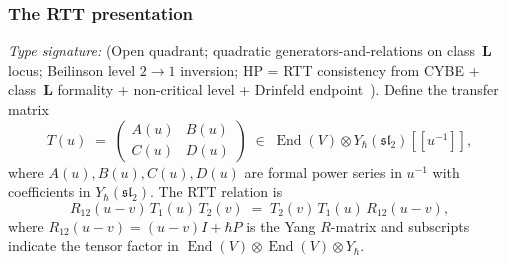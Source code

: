 \subsubsection*{The RTT presentation}

\begin{theorem}
\label{thm:rtt-sl2}
\emph{Type signature:} (Open quadrant; quadratic generators-and-relations
on class~$\mathbf L$ locus; Beilinson level $2 \to 1$ inversion; HP =
RTT consistency from CYBE + class~$\mathbf L$ formality + non-critical
level + Drinfeld endpoint~\cite{Drinfeld88}).
Define the transfer matrix
\begin{equation}\label{eq:transfer-matrix-sl2}
T(u)\;=\;
\begin{pmatrix}
A(u)&B(u)\\C(u)&D(u)
\end{pmatrix}
\;\in\;\operatorname{End}(V)\otimes Y_\hbar(\mathfrak{sl}_2)[\![u^{-1}]\!],
\end{equation}
where $A(u),B(u),C(u),D(u)$ are formal power series in $u^{-1}$ with
coefficients in $Y_\hbar(\mathfrak{sl}_2)$. The RTT relation is
\begin{equation}\label{eq:rtt-sl2}
R_{12}(u{-}v)\,T_1(u)\,T_2(v)
\;=\;
T_2(v)\,T_1(u)\,R_{12}(u{-}v),
\end{equation}
where $R_{12}(u{-}v)=(u{-}v)I+\hbar P$ is the Yang $R$-matrix and
subscripts indicate the tensor factor in
$\operatorname{End}(V)\otimes\operatorname{End}(V)\otimes Y_\hbar$.


\end{theorem}
